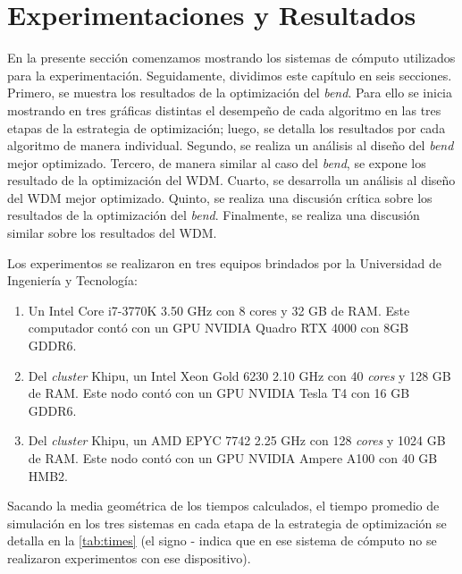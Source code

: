 \chapter{Experimentaciones y Resultados}\label{chapter:results}

En la presente sección comenzamos mostrando los sistemas de cómputo utilizados para la experimentación.
Seguidamente, dividimos este capítulo en seis secciones.
Primero, se muestra los resultados de la optimización del \emph{bend}.
Para ello se inicia mostrando en tres gráficas distintas el desempeño de cada algoritmo en 
las tres etapas de la estrategia de optimización; luego, se detalla los resultados por cada algoritmo
de manera individual.
Segundo, se realiza un análisis al diseño del \emph{bend} mejor optimizado.
Tercero, de manera similar al caso del \emph{bend}, se expone los resultado de la optimización del WDM.
Cuarto, se desarrolla un análisis al diseño del WDM mejor optimizado.
Quinto, se realiza una discusión crítica sobre los resultados de la optimización del \emph{bend}.
Finalmente, se realiza una discusión similar sobre los resultados del WDM.

Los experimentos se realizaron en tres equipos brindados por la Universidad de Ingeniería y Tecnología:

\begin{enumerate}
  \item Un Intel Core i7-3770K 3.50 GHz con 8 cores y 32 GB de RAM.
        Este computador contó con un GPU NVIDIA Quadro RTX 4000 con 8GB GDDR6.

  \item Del \emph{cluster} Khipu, un Intel Xeon Gold 6230 2.10 GHz con 40 \emph{cores} y 128 GB de RAM.
        Este nodo contó con un GPU NVIDIA Tesla T4 con 16 GB GDDR6.

  \item Del \emph{cluster} Khipu, un AMD EPYC 7742 2.25 GHz con 128 \emph{cores} y 1024 GB de RAM.
        Este nodo contó con un GPU NVIDIA Ampere A100 con 40 GB HMB2.

\end{enumerate}

Sacando la media geométrica de los tiempos calculados, el tiempo promedio de simulación en los tres 
sistemas en cada etapa de la estrategia de optimización se detalla en la \autoref{tab:times} (el signo -
indica que en ese sistema de cómputo no se realizaron experimentos con ese dispositivo).

